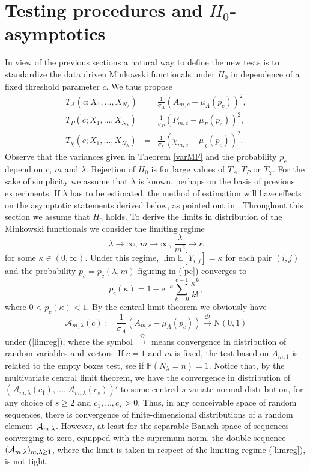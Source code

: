 \documentclass[12pt]{article}
\def\P{\mathbb{P}}
\def\BE{\mathbb{E}}
\def\cd{\stackrel{\mathcal{D}}{\longrightarrow}}
\begin{document}
\section{Testing procedures and $H_0$-asymptotics}\label{sec:testH0asy}
In view of the previous sections a natural way to define the new tests is to standardize the data driven Minkowski functionals under $H_0$ in dependence of a fixed threshold parameter $c$. We thus propose
\begin{eqnarray}
  T_A(c;X_1,\ldots,X_{N_\lambda}) &=& \frac1{\sigma_A}\left(A_{m,c}-\mu_A(p_c)\right)^2, \\
  T_P(c;X_1,\ldots,X_{N_\lambda}) &=& \frac1{\sigma_P}\left(P_{m,c}-\mu_P(p_c)\right)^2, \\
  T_\chi(c;X_1,\ldots,X_{N_\lambda}) &=& \frac1{\sigma_\chi}\left(\chi_{m,c}-\mu_\chi(p_c)\right)^2.
\end{eqnarray}
Observe that the variances given in Theorem \ref{varMF} and the probability $p_c$ depend on $c$, $m$ and $\lambda$.
Rejection of $H_0$ is for large values of $T_A, T_P$ or $T_\chi$. For the sake of simplicity we assume that $\lambda$ is known, perhaps on the basis of previous experiments.
 If $\lambda$ has to be estimated, the method of estimation will have effects on the asymptotic statements derived below, as pointed out in \cite{21}.
Throughout this section we assume that $H_0$ holds. To derive the limits in distribution of the Minkowski functionals we consider the limiting regime
\begin{equation}\label{limreg}
\lambda\rightarrow\infty,\,m\rightarrow\infty,\,\frac{\lambda}{m^2}\rightarrow\kappa
\end{equation}
for some $\kappa\in(0,\infty)$. Under this regime, $\lim\BE\left[Y_{i,j}\right]=\kappa$ for each pair $(i,j)$ and the probability $p_c=p_c(\lambda,m)$ figuring in (\ref{pc}) converges to
\begin{equation}\label{pckappa}
p_c(\kappa)=1-\textrm{e}^{-\kappa}\sum_{k=0}^{c-1}\frac{\kappa^k}{k!},
\end{equation}
where $0<p_c(\kappa)<1$. By the central limit theorem we obviously have
\begin{equation*}
\mathcal{A}_{m,\lambda}(c):=\frac{1}{\sigma_A}\left(A_{m,c}-\mu_A(p_c)\right)\cd \mbox{N}(0,1)
\end{equation*}
under (\ref{limreg}), where the symbol $\cd$ means convergence in distribution of random variables and vectors. If $c=1$ and $m$ is fixed, the test based on $A_{m,1}$ is related to the empty boxes test, see \cite{29} if $\P(N_\lambda= n)=1$. Notice that, by the multivariate central limit theorem, we have the convergence in distribution of $(\mathcal{A}_{m,\lambda}(c_1),\ldots, \mathcal{A}_{m,\lambda}(c_s))'$ to some centred $s$-variate normal distribution, for any choice of
$s \ge 2$ and $c_1,\ldots, c_s >0$.  Thus, in any conceivable space of random sequences, there is convergence of finite-dimensional distributions of a random element
${\cal A}_{m,\lambda}$. However, at least for the separable Banach space of sequences converging to zero, equipped with the supremum norm, the double sequence $({\cal A}_{m,\lambda})_{m,\lambda \ge 1}$, where the limit is taken in respect of the limiting regime (\ref{limreg}), is not tight.
\end{document}
